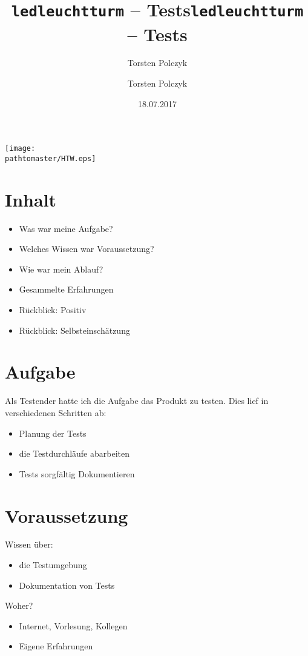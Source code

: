 \documentclass[ignorenonframetext, 11pt, table]{beamer}
\author{Torsten Polczyk}
\title{\texttt{ledleuchtturm} -- Tests}
\date{18.07.2017}
\gdef\pathtomaster{../_LaTeX_master}
\begin{document}
\author{Torsten Polczyk}
\title{\texttt{ledleuchtturm} -- Tests}

\begin{frame}[plain]
\begin{center}
\texttt{[image: \\pathtomaster/HTW.eps]}
\end{center}
\maketitle
\end{frame}

\section*{Inhalt}
\begin{frame}
\begin{itemize}
\setlength\itemsep{0.2em}
\item Was war meine Aufgabe?
\item Welches Wissen war Voraussetzung?
\item Wie war mein Ablauf?
\item Gesammelte Erfahrungen
\item Rückblick: Positiv   
\item Rückblick: Selbsteinschätzung
\end{itemize}
\end{frame}

\section*{Aufgabe}
\begin{frame}
	Als Testender hatte ich die Aufgabe das Produkt zu testen. Dies lief in verschiedenen Schritten ab: \newline
	\pause
	\begin{itemize}
		\item Planung der Tests
		\item die Testdurchläufe abarbeiten
		\item Tests sorgfältig Dokumentieren
	\end{itemize}
\end{frame}

\section*{Voraussetzung}
\begin{frame}
Wissen über:
\begin{itemize}
	\item die Testumgebung
	\item Dokumentation von Tests
\end{itemize}
Woher?
\begin{itemize}
	\item Internet, Vorlesung, Kollegen
	\item Eigene Erfahrungen
\end{itemize}
\end{frame}
\end{document}
